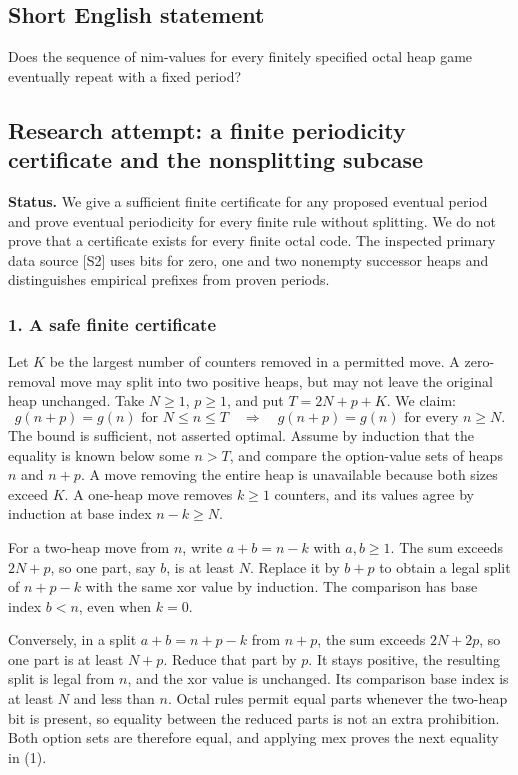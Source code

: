 \documentclass[11pt,a4paper]{article}
\begin{document}
\subsection{Short English statement}

Does the sequence of nim-values for every finitely specified octal heap game eventually repeat with a fixed period?

\subsection{Research attempt: a finite periodicity certificate and the nonsplitting subcase}
\textbf{Status.} We give a sufficient finite certificate for any proposed eventual period and prove eventual periodicity for every finite rule without splitting. We do not prove that a certificate exists for every finite octal code. The inspected primary data source [S2] uses bits for zero, one and two nonempty successor heaps and distinguishes empirical prefixes from proven periods.

\subsubsection{1. A safe finite certificate}
Let $K$ be the largest number of counters removed in a permitted move. A zero-removal move may split into two positive heaps, but may not leave the original heap unchanged. Take $N\geq1$, $p\geq1$, and put $T=2N+p+K$. We claim:
\[g(n+p)=g(n)\text{ for }N\leq n\leq T
\quad\Longrightarrow\quad g(n+p)=g(n)\text{ for every }n\geq N.\tag{1}\]
The bound is sufficient, not asserted optimal. Assume by induction that the equality is known below some $n>T$, and compare the option-value sets of heaps $n$ and $n+p$. A move removing the entire heap is unavailable because both sizes exceed $K$. A one-heap move removes $k\geq1$ counters, and its values agree by induction at base index $n-k\geq N$.

For a two-heap move from $n$, write $a+b=n-k$ with $a,b\geq1$. The sum exceeds $2N+p$, so one part, say $b$, is at least $N$. Replace it by $b+p$ to obtain a legal split of $n+p-k$ with the same xor value by induction. The comparison has base index $b<n$, even when $k=0$.

Conversely, in a split $a+b=n+p-k$ from $n+p$, the sum exceeds $2N+2p$, so one part is at least $N+p$. Reduce that part by $p$. It stays positive, the resulting split is legal from $n$, and the xor value is unchanged. Its comparison base index is at least $N$ and less than $n$. Octal rules permit equal parts whenever the two-heap bit is present, so equality between the reduced parts is not an extra prohibition. Both option sets are therefore equal, and applying mex proves the next equality in (1).
\end{document}

